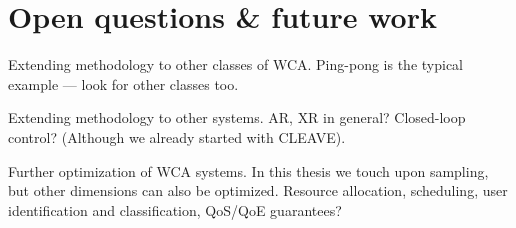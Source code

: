 \chapter{Open questions \& future work}

Extending methodology to other classes of \ac{WCA}.
Ping-pong is the typical example --- look for other classes too.

Extending methodology to other systems.
\ac{AR}, \ac{XR} in general?
Closed-loop control? (Although we already started with CLEAVE).

Further optimization of \ac{WCA} systems.
In this thesis we touch upon sampling, but other dimensions can also be optimized.
Resource allocation, scheduling, user identification and classification, QoS/QoE guarantees?